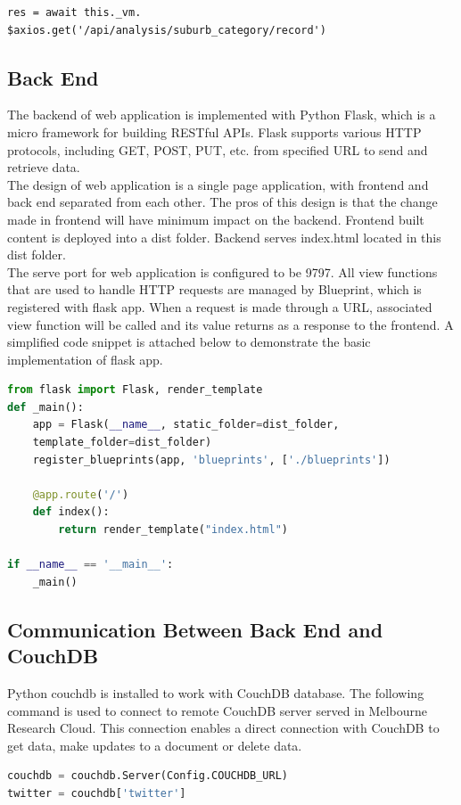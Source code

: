 \documentclass[parskip=full, 11pt]{article}
\begin{document}
\begin{lstlisting}
res = await this._vm.
$axios.get('/api/analysis/suburb_category/record')
\end{lstlisting}

\subsection{Back End}
\label{sec:Back_End}
The backend of web application is implemented with Python Flask, which is a micro framework for building RESTful APIs. Flask supports various HTTP protocols, including GET, POST, PUT, etc. from specified URL to send and retrieve data.\\
The design of web application is a single page application, with frontend and back end separated from each other. The pros of this design is that the change made in frontend will have minimum impact on the backend. Frontend built content is deployed into a dist folder. Backend serves index.html located in this dist folder.\\
The serve port for web application is configured to be 9797. All view functions that are used to handle HTTP requests are managed by Blueprint, which is registered with flask app. When a request is made through a URL, associated view function will be called and its value returns as a response to the frontend. A simplified code snippet is attached below to demonstrate the basic implementation of flask app.

\begin{lstlisting}[language=Python]
from flask import Flask, render_template
def _main():
    app = Flask(__name__, static_folder=dist_folder, 
    template_folder=dist_folder)
    register_blueprints(app, 'blueprints', ['./blueprints'])
    
    @app.route('/')
    def index():
        return render_template("index.html")

if __name__ == '__main__':
    _main()

\end{lstlisting}

\subsection{Communication Between Back End and CouchDB}
Python couchdb is installed to work with CouchDB database. The following command is used to connect to remote CouchDB server served in Melbourne Research Cloud. This connection enables a direct connection with CouchDB to get data, make updates to a document or delete data. 
\begin{lstlisting}[language=Python]
couchdb = couchdb.Server(Config.COUCHDB_URL)
twitter = couchdb['twitter']
\end{lstlisting}
\end{document}
